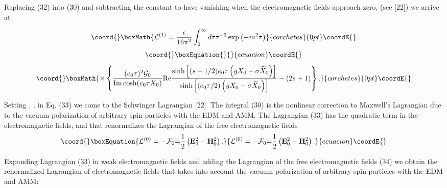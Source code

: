 \documentclass[a4paper,12pt]{article}
\begin{document}
Replacing (32) into (30) and subtracting the constant to have
vanishing \coordHE{} when the electromagnetic fields
approach zero, (see [22]) we arrive at

\[\coord{}\boxMath{
\mathcal{L}^{(1)}=\frac \epsilon {16\pi ^2}\int_0^\infty d\tau \tau
^{-3}\exp \left( -m^2\tau \right)
}{corchetes}{0pt}\coordE{}\]
\vspace{-8mm}
\begin{equation}\coord{}\boxEquation{  \label{33}
}{  }{ecuacion}\coordE{}\end{equation}
\vspace{-8mm}
\[\coord{}\boxMath{
\times \left\{ \frac{(e_0\tau )^2\mathcal{G}_0}{\mbox{Im}\cosh
(e_0\tau X_0)} \mbox{Re}\frac{\sinh \left[ (s+1/2)e_0\tau \left(
gX_0-\sigma \widetilde{X} _0\right) \right] }{\sinh \left[ \left(
e_0\tau /2\right) \left( gX_0-\sigma \widetilde{X}_0\right)
\right] }-\left( 2s+1\right) \right\}.
}{corchetes}{0pt}\coordE{}\]

Setting \coordHE{}, \coordHE{}, \coordHE{} in Eq. (33) we come to the
Schwinger Lagrangian [22]. The integral (30) is the nonlinear correction to
Maxwell's Lagrangian due to the vacuum polarization of arbitrary spin
particles with the EDM and AMM. The Lagrangian (33) has the quadratic term
in the electromagnetic fields, and that renormalizes the Lagrangian of the
free electromagnetic fields
\begin{equation}\coord{}\boxEquation{
\mathcal{L}^{(0)}=-\mathcal{F}_0\mathcal{=}\frac 12\left( \mathbf{E}_0^2-
\mathbf{H}_0^2\right).  \label{34}
}{
\mathcal{L}^{(0)}=-\mathcal{F}_0\mathcal{=}\frac 12\left( \mathbf{E}_0^2-
\mathbf{H}_0^2\right).  }{ecuacion}\coordE{}\end{equation}

Expanding Lagrangian (33) in weak electromagnetic fields and adding the
Lagrangian of the free electromagnetic fields (34) we obtain the
renormalized Lagrangian of electromagnetic fields that takes into account
the vacuum polarization of arbitrary spin particles with the EDM and AMM:
\end{document}
